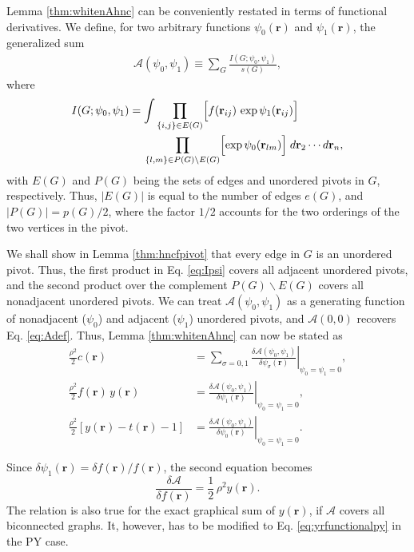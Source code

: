 \documentclass[preprint]{revtex4-1}
\newcommand{\vct}[1]{\mathbf{#1}}
\providecommand{\vr}{} %
\renewcommand{\vr}{\vct{r}}
\newcommand{\A}{\mathcal{A}}
\begin{document}
Lemma \ref{thm:whitenAhnc} can be conveniently
restated in terms of functional derivatives.
%
We define, for two arbitrary functions $\psi_0(\vr)$ and $\psi_1(\vr)$,
the generalized sum
\begin{align}
  \A(\psi_0, \psi_1)
\equiv
  \sum_G \frac{ I(G; \psi_0, \psi_1) } { s(G) },
\label{eq:Apsi}
\end{align}
where
\begin{align}
  I(G; \psi_0, \psi_1)
&=
  \int
    \prod_{\{i, j\} \in E(G)}
    \Bigl[
      f(\vr_{ij}) \, \exp \psi_1(\vr_{ij})
    \Bigr]
  \notag
  \\
& \hphantom{=\,\,\,}
    \prod_{
      \{l, m\} \in P(G) \backslash E(G)
    }
    \Bigl[
      \exp \psi_0(\vr_{lm})
    \Bigr]
  \;
  d\vr_2 \cdots d\vr_n,
  \label{eq:Ipsi}
\end{align}
with $E(G)$ and $P(G)$ being the sets of edges and unordered pivots in $G$,
respectively.
%
Thus, $|E(G)|$ is equal to the number of edges $e(G)$,
and $|P(G)| = p(G)/2$,
where the factor $1/2$ accounts for the two orderings
of the two vertices in the pivot.



We shall show in Lemma \ref{thm:hncfpivot} that
every edge in $G$ is an unordered pivot.
%
Thus,
the first product in Eq. \eqref{eq:Ipsi}
covers all adjacent unordered pivots,
and the second product over the complement
$P(G) \backslash E(G)$
covers all nonadjacent unordered pivots.
%
We can treat
$\A(\psi_0, \psi_1)$
as a generating function
of nonadjacent ($\psi_0$) and adjacent ($\psi_1$) unordered pivots,
%
and $\A(0,0)$ recovers Eq. \eqref{eq:Adef}.
%
Thus, Lemma \ref{thm:whitenAhnc} can now be stated as
\begin{align*}
  \frac{\rho^2}{2} c(\vr)
&=
  \left.
  \sum_{\sigma = 0, 1}
  \frac{ \delta \A(\psi_0, \psi_1) } { \delta \psi_\sigma(\vr) }
  \right|_{\psi_0 = \psi_1 = 0},
\\
%
%
%
  \frac{\rho^2}{2} f(\vr) \, y(\vr)
&=
  \left.
  \frac{ \delta \A(\psi_0, \psi_1) } { \delta \psi_1(\vr) }
  \right|_{\psi_0 = \psi_1 = 0},
\\
%
%
%
  \frac{\rho^2}{2}[ y(\vr) - t(\vr) - 1 ]
&=
  \left.
  \frac{ \delta \A(\psi_0, \psi_1) } { \delta \psi_0(\vr) }
  \right|_{\psi_0 = \psi_1 = 0}.
\end{align*}

Since $\delta \psi_1(\vr) = \delta f(\vr)/ f(\vr)$,
the second equation becomes\cite{hiroike1957, morita1958, *morita1960, *morita1960I}
\begin{equation}
  \frac{ \delta \A } { \delta f(\vr) }
  = \frac{1}{2} \, \rho^2 y(\vr).
  \label{eq:yrfunctional}
\end{equation}
The relation is also true for the exact graphical sum of $y(\vr)$,
if $\A$ covers all biconnected graphs.
%
It, however, has to be modified to
Eq. \eqref{eq:yrfunctionalpy}
in the PY case.
\end{document}

